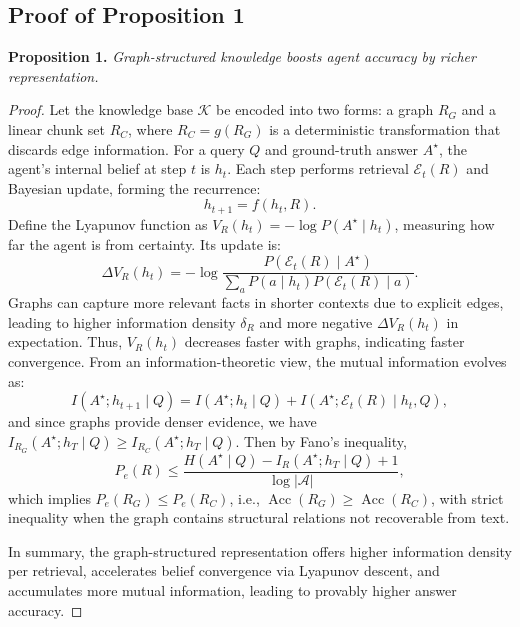 \documentclass{article}
\theoremstyle{plain}
\theoremstyle{definition}
\theoremstyle{remark}
\begin{document}
\subsection{Proof of Proposition 1}
\label{proof1}
\textbf{Proposition 1.}
\textit{Graph-structured knowledge boosts agent accuracy by richer representation.}\vspace{-2mm}
\begin{proof}
Let the knowledge base $\mathcal K$ be encoded into two forms: a graph $R_G$ and a linear chunk set $R_C$, where $R_C = g(R_G)$ is a deterministic transformation that discards edge information. For a query $Q$ and ground-truth answer $A^\star$, the agent’s internal belief at step $t$ is $h_t$. Each step performs retrieval $\mathcal E_t(R)$ and Bayesian update, forming the recurrence:
\begin{equation}
h_{t+1} = f(h_t, R).
\end{equation}
Define the Lyapunov function as $V_R(h_t) = -\log P(A^\star \mid h_t)$, measuring how far the agent is from certainty. Its update is:
\begin{equation}
\Delta V_R(h_t) = -\log \frac{P(\mathcal E_t(R) \mid A^\star)}{\sum_{a} P(a \mid h_t) P(\mathcal E_t(R) \mid a)}.
\end{equation}
Graphs can capture more relevant facts in shorter contexts due to explicit edges, leading to higher information density $\delta_R$ and more negative $\Delta V_R(h_t)$ in expectation. Thus, $V_R(h_t)$ decreases faster with graphs, indicating faster convergence. From an information-theoretic view, the mutual information evolves as:
\begin{equation}
I(A^\star; h_{t+1} \mid Q) = I(A^\star; h_t \mid Q) + I(A^\star; \mathcal E_t(R) \mid h_t, Q),
\end{equation}
and since graphs provide denser evidence, we have $I_{R_G}(A^\star; h_T \mid Q) \ge I_{R_C}(A^\star; h_T \mid Q)$.  
Then by Fano’s inequality,
\begin{equation}
P_e(R) \le \frac{H(A^\star \mid Q) - I_R(A^\star; h_T \mid Q) + 1}{\log |\mathcal A|},
\end{equation}
which implies $P_e(R_G) \le P_e(R_C)$, i.e., $\operatorname{Acc}(R_G) \ge \operatorname{Acc}(R_C)$, with strict inequality when the graph contains structural relations not recoverable from text.

In summary, the graph-structured representation offers higher information density per retrieval, accelerates belief convergence via Lyapunov descent, and accumulates more mutual information, leading to provably higher answer accuracy.
\end{proof}
\end{document}

